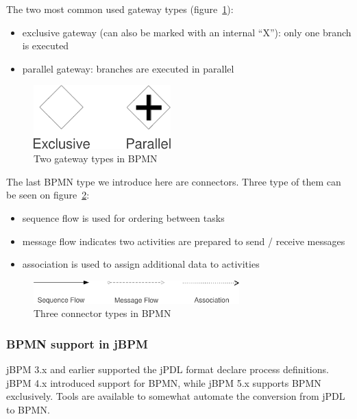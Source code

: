 The two most common used gateway types (figure~\ref{fig:bpmn-gateway-types}):

\begin{itemize}
\item exclusive gateway (can also be marked with an internal ``X''): only one branch is executed
\item parallel gateway: branches are executed in parallel
\end{itemize}

\begin{figure}[H]
\centering
\includegraphics[width=200px,keepaspectratio]{bpmn-gateway-types.pdf}
\caption{Two gateway types in BPMN}
\label{fig:bpmn-gateway-types}
\end{figure}

The last BPMN type we introduce here are connectors. Three type of them can be
seen on figure~\ref{fig:bpmn-connector-types}:

\begin{itemize}
\item sequence flow is used for ordering between tasks
\item message flow indicates two activities are prepared to send / receive messages
\item association is used to assign additional data to activities
\end{itemize}

\begin{figure}[H]
\centering
\includegraphics[width=300px,keepaspectratio]{bpmn-connector-types.pdf}
\caption{Three connector types in BPMN}
\label{fig:bpmn-connector-types}
\end{figure}

\subsubsection*{BPMN support in jBPM}

jBPM 3.x and earlier supported the jPDL format declare process definitions.
jBPM 4.x introduced support for BPMN, while jBPM 5.x supports BPMN exclusively.
Tools are available to somewhat automate the conversion from jPDL to BPMN.

